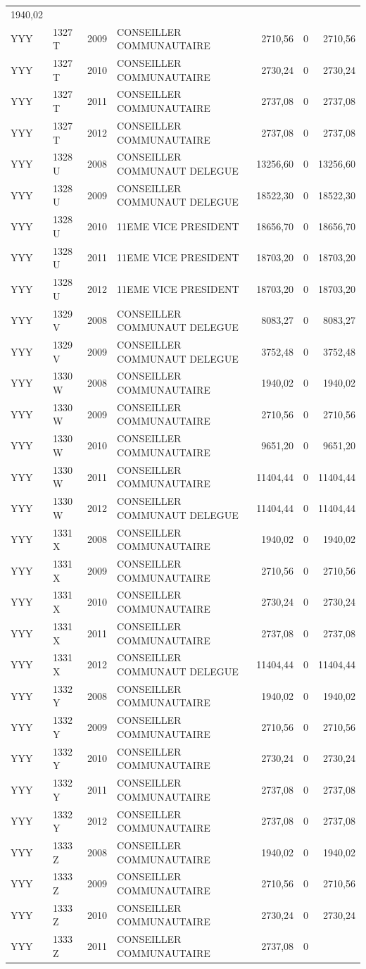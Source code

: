 \begin{longtable}[]{@{}llrlrrr@{}}
1940,02\tabularnewline
YYY & 1327 T & 2009 & CONSEILLER COMMUNAUTAIRE & 2710,56 & 0 &
2710,56\tabularnewline
YYY & 1327 T & 2010 & CONSEILLER COMMUNAUTAIRE & 2730,24 & 0 &
2730,24\tabularnewline
YYY & 1327 T & 2011 & CONSEILLER COMMUNAUTAIRE & 2737,08 & 0 &
2737,08\tabularnewline
YYY & 1327 T & 2012 & CONSEILLER COMMUNAUTAIRE & 2737,08 & 0 &
2737,08\tabularnewline
YYY & 1328 U & 2008 & CONSEILLER COMMUNAUT DELEGUE & 13256,60 & 0 &
13256,60\tabularnewline
YYY & 1328 U & 2009 & CONSEILLER COMMUNAUT DELEGUE & 18522,30 & 0 &
18522,30\tabularnewline
YYY & 1328 U & 2010 & 11EME VICE PRESIDENT & 18656,70 & 0 &
18656,70\tabularnewline
YYY & 1328 U & 2011 & 11EME VICE PRESIDENT & 18703,20 & 0 &
18703,20\tabularnewline
YYY & 1328 U & 2012 & 11EME VICE PRESIDENT & 18703,20 & 0 &
18703,20\tabularnewline
YYY & 1329 V & 2008 & CONSEILLER COMMUNAUT DELEGUE & 8083,27 & 0 &
8083,27\tabularnewline
YYY & 1329 V & 2009 & CONSEILLER COMMUNAUT DELEGUE & 3752,48 & 0 &
3752,48\tabularnewline
YYY & 1330 W & 2008 & CONSEILLER COMMUNAUTAIRE & 1940,02 & 0 &
1940,02\tabularnewline
YYY & 1330 W & 2009 & CONSEILLER COMMUNAUTAIRE & 2710,56 & 0 &
2710,56\tabularnewline
YYY & 1330 W & 2010 & CONSEILLER COMMUNAUTAIRE & 9651,20 & 0 &
9651,20\tabularnewline
YYY & 1330 W & 2011 & CONSEILLER COMMUNAUTAIRE & 11404,44 & 0 &
11404,44\tabularnewline
YYY & 1330 W & 2012 & CONSEILLER COMMUNAUT DELEGUE & 11404,44 & 0 &
11404,44\tabularnewline
YYY & 1331 X & 2008 & CONSEILLER COMMUNAUTAIRE & 1940,02 & 0 &
1940,02\tabularnewline
YYY & 1331 X & 2009 & CONSEILLER COMMUNAUTAIRE & 2710,56 & 0 &
2710,56\tabularnewline
YYY & 1331 X & 2010 & CONSEILLER COMMUNAUTAIRE & 2730,24 & 0 &
2730,24\tabularnewline
YYY & 1331 X & 2011 & CONSEILLER COMMUNAUTAIRE & 2737,08 & 0 &
2737,08\tabularnewline
YYY & 1331 X & 2012 & CONSEILLER COMMUNAUT DELEGUE & 11404,44 & 0 &
11404,44\tabularnewline
YYY & 1332 Y & 2008 & CONSEILLER COMMUNAUTAIRE & 1940,02 & 0 &
1940,02\tabularnewline
YYY & 1332 Y & 2009 & CONSEILLER COMMUNAUTAIRE & 2710,56 & 0 &
2710,56\tabularnewline
YYY & 1332 Y & 2010 & CONSEILLER COMMUNAUTAIRE & 2730,24 & 0 &
2730,24\tabularnewline
YYY & 1332 Y & 2011 & CONSEILLER COMMUNAUTAIRE & 2737,08 & 0 &
2737,08\tabularnewline
YYY & 1332 Y & 2012 & CONSEILLER COMMUNAUTAIRE & 2737,08 & 0 &
2737,08\tabularnewline
YYY & 1333 Z & 2008 & CONSEILLER COMMUNAUTAIRE & 1940,02 & 0 &
1940,02\tabularnewline
YYY & 1333 Z & 2009 & CONSEILLER COMMUNAUTAIRE & 2710,56 & 0 &
2710,56\tabularnewline
YYY & 1333 Z & 2010 & CONSEILLER COMMUNAUTAIRE & 2730,24 & 0 &
2730,24\tabularnewline
YYY & 1333 Z & 2011 & CONSEILLER COMMUNAUTAIRE & 2737,08 & 0 &

\end{longtable}
